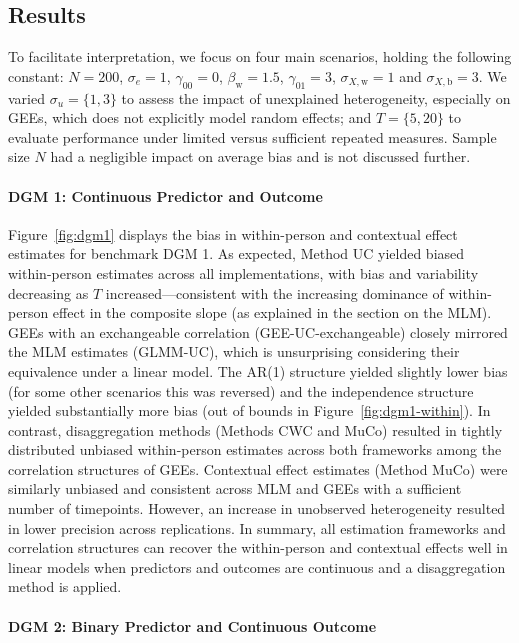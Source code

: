 \documentclass[stu]{apa7}
\begin{document}
\subsection{Results}

To facilitate interpretation, we focus on four main scenarios, holding the following constant: \( N = 200 \), \( \sigma_e = 1 \), \( \gamma_{00} = 0 \), \( \beta_{\text{w}} = 1.5 \), \( \gamma_{01} = 3 \),  \(\sigma_{X,\text{w}} = 1\) and \(\sigma_{X,\text{b}} = 3\). We varied \(\sigma_u = \{1, 3\}\) to assess the impact of unexplained heterogeneity, especially on GEEs, which does not explicitly model random effects; and \( T = \{5, 20\} \) to evaluate performance under limited versus sufficient repeated measures. Sample size \(N\) had a negligible impact on average bias and is not discussed further.

\paragraph{DGM 1: Continuous Predictor and Outcome}

Figure~\ref{fig:dgm1} displays the bias in within-person and contextual effect estimates for benchmark DGM 1. As expected, Method UC yielded biased within-person estimates across all implementations, with bias and variability decreasing as \(T\) increased---consistent with the increasing dominance of within-person effect in the composite slope (as explained in the section on the MLM). GEEs with an exchangeable correlation (GEE-UC-exchangeable) closely mirrored the MLM estimates (GLMM-UC), which is unsurprising considering their equivalence under a linear model. The AR(1) structure yielded slightly lower bias (for some other scenarios this was reversed) and the independence structure yielded substantially more bias (out of bounds in Figure~\ref{fig:dgm1-within}). In contrast, disaggregation methods (Methods CWC and MuCo) resulted in tightly distributed unbiased within-person estimates across both frameworks among the correlation structures of GEEs. Contextual effect estimates (Method MuCo) were similarly unbiased and consistent across MLM and GEEs with a sufficient number of timepoints. However, an increase in unobserved heterogeneity resulted in lower precision across replications. In summary, all estimation frameworks and correlation structures can recover the within-person and contextual effects well in linear models when predictors and outcomes are continuous and a disaggregation method is applied.

\paragraph{DGM 2: Binary Predictor and Continuous Outcome}
\end{document}
